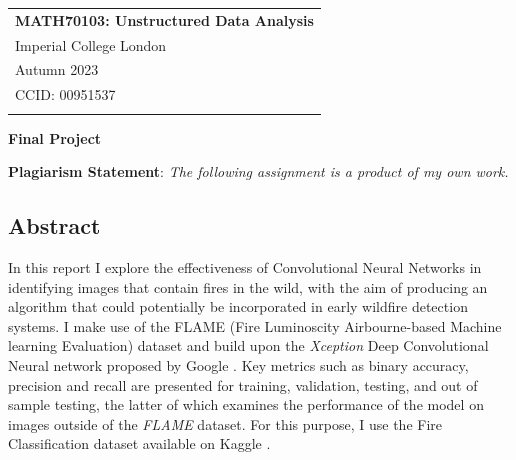 \documentclass[a4paper,11pt]{article} %
\begin{document}



\thispagestyle{empty} %

\begin{tabular}{p{15.5cm}} %
{\large \bf MATH70103: Unstructured Data Analysis} \\
Imperial College London \\ Autumn 2023  \\ CCID: 00951537\\
\hline %
\\
\end{tabular} %

\vspace*{0.3cm} %

\begin{center} %
	{\Large \bf Final Project} %
\end{center}  

\vspace{0.4cm}


\textbf{Plagiarism Statement}: \emph{The following assignment is a product of my own work.}

\medskip

\subsection*{Abstract}

In this report I explore the effectiveness of Convolutional Neural Networks in identifying images
that contain fires in the wild, with the aim of producing an algorithm that could potentially be incorporated 
in early wildfire detection systems. I make use of the FLAME (Fire Luminoscity Airbourne-based Machine learning Evaluation)
dataset \cite{FLAME_dataset} and build upon the \emph{Xception} Deep Convolutional Neural network proposed by Google \cite{Xception,Szegedy_2016_CVPR,Szegedy_Ioffe_Vanhoucke_Alemi_2017}.
Key metrics such as binary accuracy, precision and recall are presented for training, validation, testing, and out of sample testing, the latter
of which examines the performance of the model on images outside of the \emph{FLAME} dataset. For this purpose, I use the Fire Classification dataset
available on Kaggle \cite{Kaggle_FIRE_Dataset}.
\end{document}
